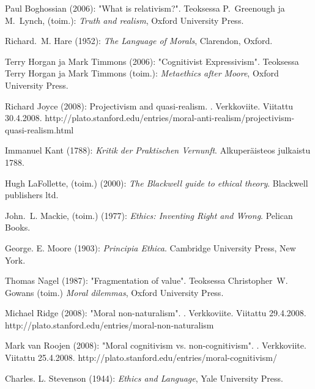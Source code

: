 \documentclass[a4paper,12pt,times,titlepage,finnish]{article}
\begin{document}
\begin{thebibliography}{29}
Paul Boghossian (2006): "What is relativism?". Teoksessa
P.~Greenough ja M.~Lynch, (toim.):
\newblock \emph{Truth and realism},
\newblock Oxford University Press.

Richard.~M. Hare (1952):
\newblock \emph{The Language of Morals},
\newblock Clarendon, Oxford.

Terry Horgan ja Mark Timmons (2006): "Cognitivist Expressivism". Teoksessa Terry Horgan ja Mark Timmons (toim.):
\newblock \emph{Metaethics after Moore},
\newblock Oxford University Press.

Richard Joyce (2008):
\newblock Projectivism and quasi-realism.
.
\newblock Verkkoviite. Viitattu 30.4.2008. http://plato.stanford.edu/entries/moral-anti-realism/projectivism-quasi-realism.html

Immanuel Kant (1788):
\newblock \emph{Kritik der Praktischen Vernunft}.
\newblock Alkuperäisteos julkaistu 1788.

Hugh LaFollette, (toim.) (2000):
\newblock \emph{The {Blackwell} guide to ethical theory}.
\newblock Blackwell publishers ltd.

John.~L. Mackie, (toim.) (1977):
\newblock \emph{Ethics: Inventing Right and Wrong}.
\newblock Pelican Books.

George. E. Moore (1903):
\newblock \emph{Principia Ethica}.
\newblock Cambridge University Press, New York.

Thomas Nagel (1987): "Fragmentation of value". Teoksessa
Christopher~W. Gowans (toim.)
\newblock \emph{Moral dilemmas},
\newblock Oxford University Press.

Michael Ridge (2008):
\newblock "Moral non-naturalism".
.
\newblock Verkkoviite. Viitattu 29.4.2008. http://plato.stanford.edu/entries/moral-non-naturalism

Mark van Roojen (2008):
\newblock "Moral cognitivism vs. non-cognitivism".
.
\newblock Verkkoviite. Viitattu 25.4.2008. http://plato.stanford.edu/entries/moral-cognitivism/

Charles. L. Stevenson (1944):
\newblock \emph{Ethics and Language},
\newblock Yale University Press.


\end{thebibliography}
\end{document}
